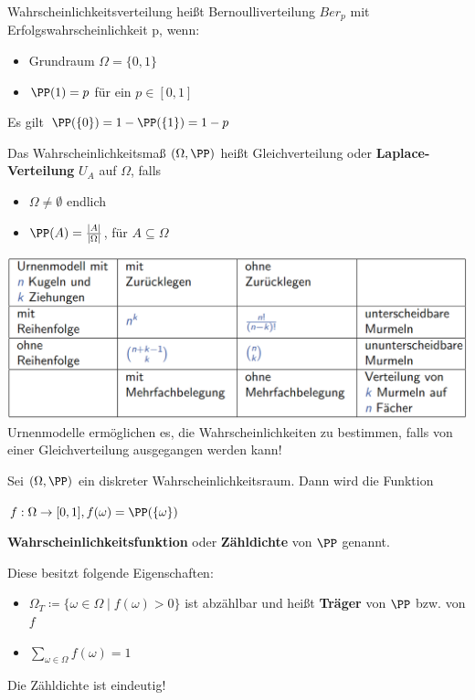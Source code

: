 Wahrscheinlichkeitsverteilung heißt Bernoulliverteilung $Ber_p$ mit Erfolgswahrscheinlichkeit p, wenn:
\begin{itemize}
	\item Grundraum $\Omega={\{0,1\}}$
	\item $\PP(1)=p$ für ein $p\in[0,1]$
\end{itemize}
Es gilt $\PP(\{0\})=1-\PP(\{1\})=1-p$

Das Wahrscheinlichkeitsmaß $(\Omega,\PP)$ heißt Gleichverteilung oder \textbf{Laplace-Verteilung} $U_A$ auf $\Omega$, falls
\begin{itemize}
	\item $\Omega\neq\emptyset$ endlich
	\item $\PP(A)=\frac{|A|}{|\Omega|}$, für $A\subseteq\Omega$
\end{itemize}

\includegraphics[width=\textwidth]{images/image1.png}
Urnenmodelle ermöglichen es, die Wahrscheinlichkeiten zu bestimmen, falls von einer Gleichverteilung ausgegangen
werden kann!

Sei $(\Omega,\PP)$ ein diskreter Wahrscheinlichkeitsraum.
Dann wird die Funktion\\
\begin{tightcenter}
	$f:\Omega\rightarrow[0,1], f(\omega)=\PP(\{\omega\})$
\end{tightcenter}
\textbf{Wahrscheinlichkeitsfunktion} oder \textbf{Zähldichte} von $\PP$ genannt. 

\pagebreak
Diese besitzt folgende Eigenschaften:
\begin{itemize}
	\item $\Omega_T\coloneqq\{\omega\in\Omega\mid f(\omega)>0\}$ ist abzählbar und heißt \textbf{Träger} von $\PP$ bzw. von $f$
	\item $\sum\limits_{\omega\in\Omega}f(\omega)=1$
\end{itemize}
Die Zähldichte ist eindeutig!

